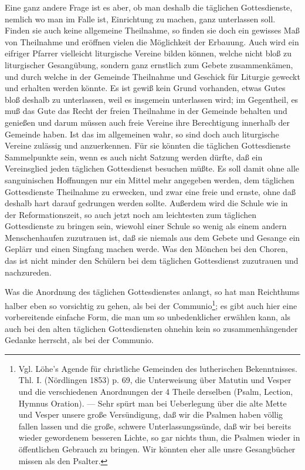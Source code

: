 Eine ganz andere Frage ist es aber, ob man deshalb die täglichen Gottesdienste, nemlich wo man im Falle ist,
Einrichtung zu machen, ganz unterlassen soll. Finden sie auch keine allgemeine Theilnahme, so finden sie doch ein gewisses Maß von Theilnahme und eröffnen vielen die Möglichkeit der Erbauung. Auch wird ein eifriger Pfarrer vielleicht liturgische Vereine bilden können, welche nicht bloß zu liturgischer Gesangübung, sondern ganz ernstlich zum Gebete zusammenkämen, und durch welche in der Gemeinde Theilnahme und Geschick für Liturgie geweckt und erhalten werden könnte. Es ist gewiß kein Grund vorhanden, etwas Gutes bloß deshalb zu unterlassen, weil es insgemein unterlassen wird; im Gegentheil, es muß das Gute das Recht der freien Theilnahme in der Gemeinde behalten und genießen und darum müssen auch freie Vereine ihre Berechtigung innerhalb der Gemeinde haben. Ist das im allgemeinen wahr, so sind doch auch liturgische Vereine zulässig und anzuerkennen. Für sie könnten die täglichen Gottesdienste Sammelpunkte sein, wenn es auch nicht Satzung werden dürfte, daß ein Vereinsglied jeden täglichen Gottesdienst besuchen müßte. Es soll damit ohne alle sanguinischen Hoffnungen nur ein Mittel mehr angegeben werden, dem täglichen Gottesdienste Theilnahme zu erwecken, und zwar eine freie und ernste, ohne daß deshalb hart darauf gedrungen werden sollte. Außerdem wird die Schule wie in der Reformationszeit, so auch jetzt noch am leichtesten zum täglichen Gottesdienste zu bringen sein, wiewohl einer Schule so wenig als einem andern Menschenhaufen zuzutrauen ist, daß sie niemals aus dem Gebete und Gesange ein Geplärr und einen Singfang machen werde. Was den Mönchen bei den Choren,
das ist nicht minder den Schülern bei dem täglichen Gottesdienst zuzutrauen und nachzureden.

Was die Anordnung des täglichen Gottesdienstes anlangt, so hat man Reichthums halber eben so vorsichtig zu gehen, als bei der Communio\footnote{Vgl. Löhe’s Agende für christliche Gemeinden des lutherischen Bekenntnisses. Thl. I. (Nördlingen 1853) p. 69, die Unterweisung über Matutin und Vesper und die verschiedenen Anordnungen der 4 Theile derselben (Psalm, Lection, Hymnus Oration). — Sehr spürt man bei Ueberlegung über die alte Mette und Vesper unsere große Versündigung, daß wir die Psalmen haben völlig fallen lassen und die große, schwere Unterlassungssünde, daß wir bei bereits wieder gewordenem besseren Lichte, so gar nichts thun, die Psalmen wieder in öffentlichen Gebrauch zu bringen. Wir könnten eher alle unsre Gesangbücher missen als den Psalter.}; es gibt auch hier eine vorbereitende einfache Form, die man um so unbedenklicher erwählen kann, als auch bei den alten täglichen Gottesdiensten ohnehin kein so zusammenhängender Gedanke herrscht, als bei der Communio.

